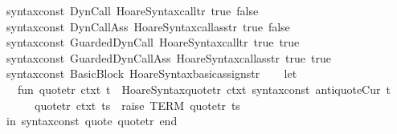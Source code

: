 \begin{isabellebody}
\ \ {\isacharparenleft}{\isacharat}{\isacharbraceleft}syntax{\isacharunderscore}const\ {\isachardoublequote}{\isacharunderscore}DynCall{\isachardoublequote}{\isacharbraceright}{\isacharcomma}\ Hoare{\isacharunderscore}Syntax{\isachardot}call{\isacharunderscore}tr\ true\ false{\isacharparenright}{\isacharcomma}\isanewline
\ \ {\isacharparenleft}{\isacharat}{\isacharbraceleft}syntax{\isacharunderscore}const\ {\isachardoublequote}{\isacharunderscore}DynCallAss{\isachardoublequote}{\isacharbraceright}{\isacharcomma}\ Hoare{\isacharunderscore}Syntax{\isachardot}call{\isacharunderscore}ass{\isacharunderscore}tr\ true\ false{\isacharparenright}{\isacharcomma}\isanewline
\ \ {\isacharparenleft}{\isacharat}{\isacharbraceleft}syntax{\isacharunderscore}const\ {\isachardoublequote}{\isacharunderscore}GuardedDynCall{\isachardoublequote}{\isacharbraceright}{\isacharcomma}\ Hoare{\isacharunderscore}Syntax{\isachardot}call{\isacharunderscore}tr\ true\ true{\isacharparenright}{\isacharcomma}\isanewline
\ \ {\isacharparenleft}{\isacharat}{\isacharbraceleft}syntax{\isacharunderscore}const\ {\isachardoublequote}{\isacharunderscore}GuardedDynCallAss{\isachardoublequote}{\isacharbraceright}{\isacharcomma}\ Hoare{\isacharunderscore}Syntax{\isachardot}call{\isacharunderscore}ass{\isacharunderscore}tr\ true\ true{\isacharparenright}{\isacharcomma}\isanewline
\ \ {\isacharparenleft}{\isacharat}{\isacharbraceleft}syntax{\isacharunderscore}const\ {\isachardoublequote}{\isacharunderscore}BasicBlock{\isachardoublequote}{\isacharbraceright}{\isacharcomma}\ Hoare{\isacharunderscore}Syntax{\isachardot}basic{\isacharunderscore}assigns{\isacharunderscore}tr{\isacharparenright}{\isacharbrackright}\isanewline
{\isacartoucheclose}\isanewline
\isanewline
\isanewline
\isanewline
{}\isamarkupfalse%
\ {\isacartoucheopen}\isanewline
\ \ let\isanewline
\ \ \ \ fun\ quote{\isacharunderscore}tr\ ctxt\ {\isacharbrackleft}t{\isacharbrackright}\ {\isacharequal}\ Hoare{\isacharunderscore}Syntax{\isachardot}quote{\isacharunderscore}tr\ ctxt\ {\isacharat}{\isacharbraceleft}syntax{\isacharunderscore}const\ {\isachardoublequote}{\isacharunderscore}antiquoteCur{\isachardoublequote}{\isacharbraceright}\ t\isanewline
\ \ \ \ \ \ {\isacharbar}\ quote{\isacharunderscore}tr\ ctxt\ ts\ {\isacharequal}\ raise\ TERM\ {\isacharparenleft}{\isachardoublequote}quote{\isacharunderscore}tr{\isachardoublequote}{\isacharcomma}\ ts{\isacharparenright}{\isacharsemicolon}\isanewline
\ \ in\ {\isacharbrackleft}{\isacharparenleft}{\isacharat}{\isacharbraceleft}syntax{\isacharunderscore}const\ {\isachardoublequote}{\isacharunderscore}quote{\isachardoublequote}{\isacharbraceright}{\isacharcomma}\ quote{\isacharunderscore}tr{\isacharparenright}{\isacharbrackright}\ end\isanewline

\end{isabellebody}
